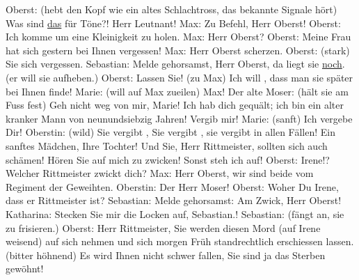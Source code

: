 \begin{ledgroupsized}[t]{13cm}
           \pstart
           Oberst: (hebt den Kopf wie ein altes Schlachtross, das bekannte Signale hört) Was
               sind \uline{das} für Töne?! Herr Leutnant!\pend
           \pstart
           Max: Zu Befehl, Herr Oberst!\pend
           \pstart
           Oberst: Ich komme um eine Kleinigkeit zu holen.\pend
           \pstart
           Max: Herr Oberst?\pend
           \pstart
           {\pb}Oberst: Meine Frau hat sich
               gestern bei Ihnen vergessen!\pend
           \pstart
           Max: Herr Oberst scherzen.\pend
           \pstart
           Oberst: (stark) Sie 
                  \uline{}
                sich vergessen.\pend
           \pstart
           Sebastian: Melde gehorsamst, Herr Oberst, da liegt sie \uline{noch}. (er will sie aufheben.)\pend
           \pstart
           Oberst: Lassen Sie! (zu Max) Ich will , dass man
               sie später bei Ihnen finde!\pend
           \pstart
           Marie: (will auf Max zueilen) Max!\pend
           \pstart
           Der alte Moser: (hält sie am Fuss fest) Geh nicht weg von mir, Marie! Ich hab dich
               gequält; ich bin ein alter kranker Mann von neunundsiebzig Jahren! Vergib mir!\pend
           \pstart
           Marie: (sanft) Ich vergebe Dir!\pend
           \pstart
           Oberstin: (wild) Sie vergibt , Sie vergibt , sie vergibt in allen Fällen! Ein sanftes Mädchen, Ihre
               Tochter! Und Sie, Herr Rittmeister, sollten sich auch schämen! Hören Sie auf mich zu
               zwicken! Sonst steh ich auf!\pend
           \pstart
           Oberst: Irene!? Welcher Rittmeister zwickt dich?\pend
           \pstart
           Max: Herr Oberst, wir sind beide vom Regiment der Geweihten.\pend
           \pstart
           Oberstin: Der Herr Moser!\pend
           \pstart
           Oberst: Woher \label{T_L01900_1v}\label{T_L01900_1h} Du Irene, dass er Rittmeister ist?\pend
           \pstart
           Sebastian: Melde gehorsamst: Am Zwick, Herr Oberst!\pend
           \pstart
           Katharina: Stecken Sie mir die Locken auf, Sebastian.!\pend
           \pstart
           Sebastian: (fängt an, sie zu frisieren.)\pend
           \pstart
           Oberst: Herr Rittmeister, Sie werden diesen Mord (auf Irene weisend) auf sich nehmen
               und sich morgen Früh standrechtlich erschiessen lassen. (bitter höhnend) Es wird
               Ihnen nicht schwer fallen, Sie sind ja das Sterben gewöhnt!\pend

\end{ledgroupsized}
